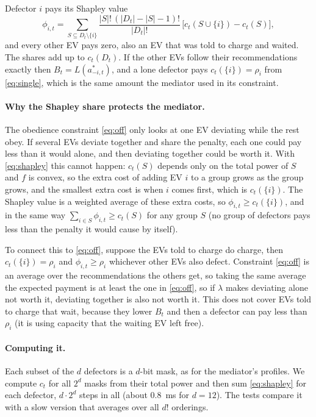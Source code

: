 \documentclass{article}
\begin{document}
Defector $i$ pays its Shapley value
\begin{equation}
\phi_{i,t} = \sum_{S \subseteq D_t \setminus \{i\}} \frac{|S|!\,(|D_t| - |S| - 1)!}{|D_t|!}\,\bigl[c_t(S \cup \{i\}) - c_t(S)\bigr],
\label{eq:shapley}
\end{equation}
and every other EV pays zero, also an EV that was told to charge and waited. The shares add up to $c_t(D_t)$. If the other EVs follow their recommendations exactly then $B_t = L(a^*_{-i,t})$, and a lone defector pays $c_t(\{i\}) = \rho_i$ from \eqref{eq:single}, which is the same amount the mediator used in its constraint.

\paragraph{Why the Shapley share protects the mediator.} The obedience constraint \eqref{eq:off} only looks at one EV deviating while the rest obey. If several EVs deviate together and share the penalty, each one could pay less than it would alone, and then deviating together could be worth it. With \eqref{eq:shapley} this cannot happen: $c_t(S)$ depends only on the total power of $S$ and $f$ is convex, so the extra cost of adding EV $i$ to a group grows as the group grows, and the smallest extra cost is when $i$ comes first, which is $c_t(\{i\})$. The Shapley value is a weighted average of these extra costs, so $\phi_{i,t} \ge c_t(\{i\})$, and in the same way $\sum_{i \in S} \phi_{i,t} \ge c_t(S)$ for any group $S$ (no group of defectors pays less than the penalty it would cause by itself).

To connect this to \eqref{eq:off}, suppose the EVs told to charge do charge, then $c_t(\{i\}) = \rho_i$ and $\phi_{i,t} \ge \rho_i$ whichever other EVs also defect. Constraint \eqref{eq:off} is an average over the recommendations the others get, so taking the same average the expected payment is at least the one in \eqref{eq:off}, so if $\lambda$ makes deviating alone not worth it, deviating together is also not worth it. This does not cover EVs told to charge that wait, because they lower $B_t$ and then a defector can pay less than $\rho_i$ (it is using capacity that the waiting EV left free).

\paragraph{Computing it.} Each subset of the $d$ defectors is a $d$-bit mask, as for the mediator's profiles. We compute $c_t$ for all $2^d$ masks from their total power and then sum \eqref{eq:shapley} for each defector, $d \cdot 2^d$ steps in all (about 0.8~ms for $d = 12$). The tests compare it with a slow version that averages over all $d!$ orderings.
\end{document}
